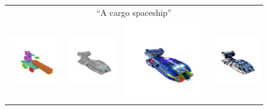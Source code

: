\begin{figure}
{\begin{tabular}{cccc}
        \multicolumn{4}{c}{``A cargo spaceship''} \\
                \includegraphics[width=0.24\linewidth, trim=60 60 20 50, clip]{images/editings/spice-e/space_ship/guidance/render_0002.jpg} &
                \includegraphics[width=0.24\linewidth, trim=60 60 20 50, clip]{images/editings/spice-e/space_ship/spice-e/spice-e_tile_2.png} &
                \includegraphics[width=0.24\linewidth, trim=60 60 20 105, clip]{images/editings/spice-e/space_ship/sds/2.png}  &
                \includegraphics[width=0.24\linewidth, trim=60 60 20 50, clip]{images/editings/spice-e/space_ship/sharp_e/sharp_e_tile_2.png} \\
                

\end{tabular}}
\end{figure}
